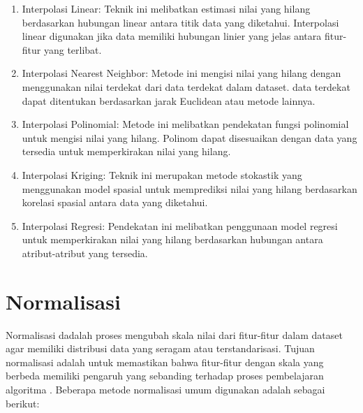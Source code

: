 \begin{enumerate}[nolistsep]
  \item Interpolasi Linear: Teknik ini melibatkan estimasi nilai yang hilang berdasarkan
        hubungan linear antara titik data yang diketahui. Interpolasi linear digunakan
        jika data memiliki hubungan linier yang jelas antara fitur-fitur yang terlibat.

  \item Interpolasi Nearest Neighbor: Metode ini mengisi nilai yang hilang dengan
        menggunakan nilai terdekat dari data terdekat dalam dataset.
        data terdekat dapat ditentukan berdasarkan jarak Euclidean atau metode lainnya.

  \item Interpolasi Polinomial: Metode ini melibatkan pendekatan fungsi polinomial
        untuk mengisi nilai yang hilang. Polinom dapat disesuaikan dengan data yang tersedia
        untuk memperkirakan nilai yang hilang.

  \item Interpolasi Kriging: Teknik ini merupakan metode stokastik yang menggunakan
        model spasial untuk memprediksi nilai yang hilang berdasarkan korelasi spasial antara
        data yang diketahui.

  \item Interpolasi Regresi: Pendekatan ini melibatkan penggunaan model regresi untuk
        memperkirakan nilai yang hilang berdasarkan hubungan antara atribut-atribut yang
        tersedia.
\end{enumerate}

\section{Normalisasi}

Normalisasi dadalah proses mengubah skala nilai dari fitur-fitur dalam dataset
agar memiliki distribusi data yang seragam atau terstandarisasi. Tujuan normalisasi
adalah untuk memastikan bahwa fitur-fitur dengan skala yang berbeda memiliki pengaruh
yang sebanding terhadap proses pembelajaran algoritma \parencite{25}. Beberapa metode
normalisasi umum digunakan adalah sebagai berikut:

